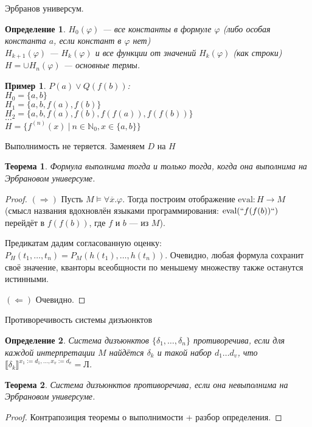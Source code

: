 \documentclass[handout]{beamer}
\newtheorem{thm}{Теорема}[section]
\newtheorem{dfn}{Определение}[section]
\newtheorem{exm}{Пример}[section]
\begin{document}
\begin{frame}{Эрбранов универсум.}
\begin{dfn}$H_0(\varphi)$ --- все константы в формуле $\varphi$ (либо особая константа $a$, если констант в $\varphi$ нет)\\
$H_{k+1}(\varphi)$ --- $H_k(\varphi)$ и все функции от значений $H_k(\varphi)$ (как строки)\\

$H = \cup H_n(\varphi)$ --- основные термы.
\end{dfn}

\begin{exm}$P(a)\vee Q(f(b))$: \\
$H_0 = \{a,b\}$\\
$H_1 = \{a,b,f(a),f(b)\}$\\
$H_2 = \{a,b,f(a),f(b),f(f(a)),f(f(b))\}$\\
$\dots$\\
$H = \{f^{(n)}(x)\ |\ n \in \mathbb{N}_0, x \in \{a,b\}\}$\end{exm}
\end{frame}

\begin{frame}{Выполнимость не теряется. Заменяем $D$ на $H$}
\begin{thm}Формула выполнима тогда и только тогда, когда она выполнима на Эрбрановом универсуме.\end{thm}
\begin{proof}
$(\Rightarrow)$ Пусть $M \models\forall \overline{x}.\varphi$. Тогда построим отображение $\text{eval}: H \rightarrow M$
(смысл названия вдохновлён языками программирования: $\text{eval}(``f(f(b))``)$ перейдёт в $f(f(b))$, где $f$ и $b$ --- из $M$).

Предикатам дадим согласованную оценку:
$P_H(t_1,\dots,t_n) = P_M(h(t_1),\dots,h(t_n))$. Очевидно, любая формула сохранит своё значение, кванторы всеобщности
по меньшему множеству также останутся истинными.

$(\Leftarrow)$ Очевидно.
\end{proof}\end{frame}

\begin{frame}{Противоречивость системы дизъюнктов}
\begin{dfn}Система дизъюнктов $\{\delta_1,\dots,\delta_n\}$ противоречива,
если для каждой интерпретации $M$ найдётся $\delta_k$ и такой набор $d_1\dots d_v$,
что $\llbracket\delta_k\rrbracket^{x_1 := d_1, \dots, x_v := d_v} = \text{Л}$.\end{dfn}
\begin{thm}Система дизъюнктов противоречива, если она невыполнима на Эрбрановом универсуме.\end{thm}
\begin{proof}Контрапозиция теоремы о выполнимости + разбор определения.
\end{proof}
\end{frame}
\end{document}
